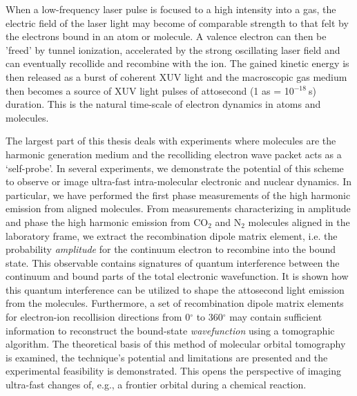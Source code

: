 When a low-frequency laser pulse is focused to a high intensity into a gas, the electric field of the laser light may become of comparable strength to that felt by the electrons bound in an atom or molecule. A valence electron can then be 'freed' by tunnel ionization, accelerated by the strong oscillating laser field and can eventually recollide and recombine with the ion. The gained kinetic energy is then released as a burst of coherent XUV light and the macroscopic gas medium then becomes a source of XUV light pulses of attosecond (1 as = 10$^{-18}\:$s) duration. This is the natural time-scale of electron dynamics in atoms and molecules.


The largest part of this thesis deals with experiments where molecules are the harmonic generation medium and the recolliding electron wave packet acts as a `self-probe'. In several experiments, we demonstrate the potential of this scheme to observe or image ultra-fast intra-molecular electronic and nuclear dynamics. In particular, we have performed the first phase measurements of the high harmonic emission from aligned molecules. From measurements characterizing in amplitude and phase the high harmonic emission from CO$_2$ and N$_2$ molecules aligned in the laboratory frame, we extract the recombination dipole matrix element, i.e. the probability \emph{amplitude} for the continuum electron to recombine into the bound state. This observable contains signatures of quantum interference between the continuum and bound parts of the total electronic wavefunction. It is shown how this quantum interference can be utilized to shape the attosecond light emission from the molecules. Furthermore, a set of recombination dipole matrix elements for electron-ion recollision directions from 0$^\circ$ to 360$^\circ$ may contain sufficient information to reconstruct the bound-state \emph{wavefunction} using a tomographic algorithm. The theoretical basis of this method of molecular orbital tomography is examined, the technique's potential and limitations are presented and the experimental feasibility is demonstrated. This opens the perspective of imaging ultra-fast changes of, e.g., a frontier orbital during a chemical reaction.


